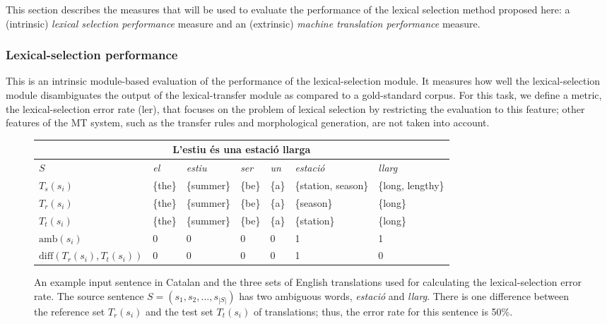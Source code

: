 \documentclass[11pt]{article}
\begin{document}
This section describes the measures that will be used to evaluate the
performance of the lexical selection method proposed here: a
(intrinsic) \emph{lexical selection performance} measure and an
(extrinsic) \emph{machine translation performance} measure.

\label{sec:eval-metrics}
\subsubsection{Lexical-selection performance}
This is an intrinsic module-based evaluation of the performance of the
lexical-selection module.  It measures how well the lexical-selection
module disambiguates the output of the lexical-transfer module as
compared to a gold-standard corpus. For this task, we define a metric,
the lexical-selection error rate ({\sc ler}), that focuses on the
problem of lexical selection by restricting the evaluation to this
feature; other features of the MT system, such as the transfer rules
and morphological generation, are not taken into account.

\begin{figure*}
\begin{center}
\setlength\tabcolsep{5.2pt}%
 \begin{tabular}{|l|llllll|}
   \hline
   \multicolumn{7}{|c|}{L'estiu \'{e}s una estaci\'{o} llarga}\\
   \hline
   $S$        & \emph{el} & \emph{estiu} & \emph{ser} & \emph{un} & \emph{estaci\'{o}} & \emph{llarg} \\
   \hline
   $T_s(s_i)$        & \{the\} & \{summer\} & \{be\} & \{a\} & \{station, season\} &  \{long, lengthy\} \\
   \hline 
   $T_r(s_i)$        & \{the\} & \{summer\} & \{be\} & \{a\} &  \{season\} & \{long\} \\
   \hline
   $T_t(s_i)$        & \{the\} & \{summer\} & \{be\} & \{a\} &  \{station\} & \{long\} \\
   \hline
   $\textrm{amb}(s_i)$ & 0     & 0          & 0      & 0     & 1            & 1 \\
   \hline
   $\mathrm{diff}(T_r(s_i), T_t(s_i))$ & 0     & 0          & 0      & 0     & 1            & 0 \\
   \hline
 \end{tabular}
 \caption{An example input sentence in Catalan and the three sets of
   English translations used for calculating the lexical-selection
   error rate. The source sentence $S = (s_1, s_2, \ldots, s_{|S|})$
   has two ambiguous words, \emph{estaci\'{o}} and \emph{llarg}. There is one difference
   between the reference set $T_r(s_i)$ and the test set $T_t(s_i)$ of
   translations; thus, the error rate for this sentence is
   50\%.}
\label{fig:ler-example}
\end{center}
\end{figure*}
\end{document}
